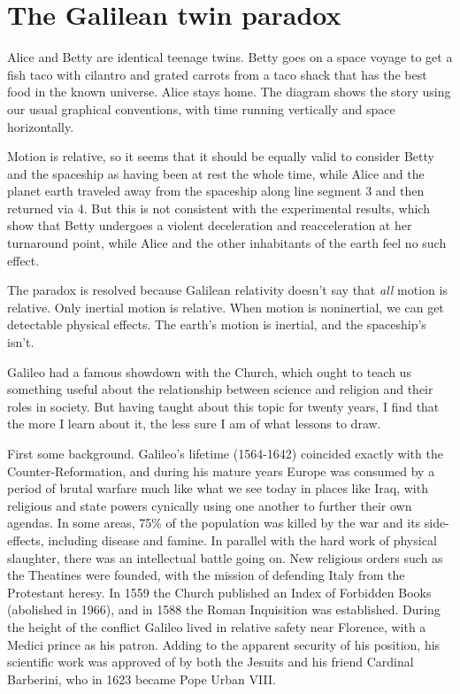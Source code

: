 \section{The Galilean twin paradox}\label{sec:galilean-twin-paradox}

Alice and Betty are identical teenage twins. Betty goes on a space voyage to get a fish taco with
cilantro and grated carrots from a
taco shack that has the best food in the known universe. Alice stays home. The diagram shows the story using our usual
graphical conventions, with time running vertically and space horizontally.

\begin{figure}[h]\label{fig:galilean-twin-paradox}
\end{figure}

Motion is relative, so it seems that it should be equally valid to consider Betty
and the spaceship as having been at rest the whole time, while
Alice and the planet earth traveled away from the spaceship along
line segment 3 and then returned via 4. But this is not consistent with the
experimental results, which show that Betty undergoes a violent
deceleration and reacceleration at her turnaround point, while Alice and the other
inhabitants of the earth feel no such effect.

The paradox is resolved because Galilean relativity doesn't say that \emph{all}
motion is relative. Only inertial motion is relative. When motion is noninertial, we can get detectable
physical effects. The earth's motion is inertial, and the spaceship's isn't.


\pagebreak


Galileo had a famous showdown with the Church, which ought to teach us something useful about
the relationship between science and religion and their roles in society. But having taught
about this topic for twenty years, I find that the more I learn about it, the less sure I am
of what lessons to draw.

First some background. Galileo's lifetime (1564-1642) coincided exactly
with the Counter-Reformation, and during his mature years Europe was consumed by a period
of brutal warfare much like what we see today in places like Iraq, with religious and state
powers cynically using one another to further their own agendas. In some areas, 75\% of
the population was killed by the war and its side-effects, including disease and famine.
In parallel with the hard work of physical slaughter, there was an intellectual battle going on.
New religious orders such as the Theatines were founded, with the mission of defending Italy from
the Protestant heresy. In 1559 the Church published an
Index of Forbidden Books (abolished in 1966), and in 1588 the Roman Inquisition was established.
During the height of the conflict Galileo lived in relative safety near Florence, with a Medici prince as his patron.
Adding to the apparent security of his position, his scientific work was approved of by both
the Jesuits and his friend Cardinal Barberini, who in 1623 became Pope Urban VIII.

